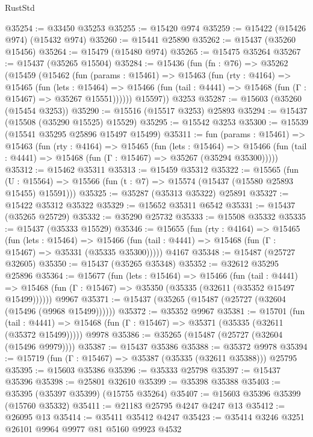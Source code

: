 \begin{lexlean}{RustStd}
\begin{coremodule}
@35254 := @33450 @35253
@35255 := @15420 @974
@35259 := @15422 (@15426 @974) (@15432 @974)
@35260 := @15441 @25890
@35262 := @15437 (@35260 @15456)
@35264 := @15479 (@15480 @974)
@35265 := @15475 @35264
@35267 := @15437 (@35265 @15504)
@35284 := @15436
    (fun (fn : @76) =>
    @35262
      (@15459
        (@15462
          (fun (params : @15461) =>
          @15463
            (fun (rty : @4164) =>
            @15465
              (fun (lets : @15464) =>
              @15466 (fun (tail : @4441) => @15468 (fun (Γ : @15467) => @35267 @15551))))))
        @15597))
    @3253
@35287 := @15603 (@35260 (@15454 @3253))
@35290 := @15516 (@15517 @3253) @25893
@35294 := @15437 (@15508 (@35290 @15525) @15529)
@35295 := @15542 @3253
@35300 := @15539 (@15541 @35295 @25896 @15497 @15499)
@35311 := fun (params : @15461) =>
  @15463
    (fun (rty : @4164) =>
    @15465
      (fun (lets : @15464) =>
      @15466 (fun (tail : @4441) => @15468 (fun (Γ : @15467) => @35267 (@35294 @35300)))))
@35312 := @15462 @35311
@35313 := @15459 @35312
@35322 := @15565
    (fun (U : @15564) => @15566 (fun (t : @7) => @15574 (@15437 (@15580 @25893 @15455) @15591)))
@35325 := @35287 (@35313 @35322) @25891
@35327 := @15422 @35312 @35322
@35329 := @15652 @35311 @6542
@35331 := @15437 (@35265 @25729)
@35332 := @35290 @25732
@35333 := @15508 @35332
@35335 := @15437 (@35333 @15529)
@35346 := @15655
    (fun (rty : @4164) =>
    @15465
      (fun (lets : @15464) =>
      @15466 (fun (tail : @4441) => @15468 (fun (Γ : @15467) => @35331 (@35335 @35300)))))
    @4167
@35348 := @15487 (@25727 @32605)
@35350 := @15437 (@35265 @35348)
@35352 := @32612 @35295 @25896
@35364 := @15677
    (fun (lets : @15464) =>
    @15466
      (fun (tail : @4441) =>
      @15468 (fun (Γ : @15467) => @35350 (@35335 (@32611 (@35352 @15497 @15499))))))
    @9967
@35371 := @15437 (@35265 (@15487 (@25727 (@32604 (@15496 (@9968 @15499))))))
@35372 := @35352 @9967
@35381 := @15701
    (fun (tail : @4441) => @15468 (fun (Γ : @15467) => @35371 (@35335 (@32611 (@35372 @15499)))))
    @9978
@35386 := @35265 (@15487 (@25727 (@32604 (@15496 @9979))))
@35387 := @15437 @35386
@35388 := @35372 @9978
@35394 := @15719 (fun (Γ : @15467) => @35387 (@35335 (@32611 @35388))) @25795
@35395 := @15603 @35386
@35396 := @35333 @25798
@35397 := @15437 @35396
@35398 := @25801 @32610
@35399 := @35398 @35388
@35403 := @35395 (@35397 @35399) (@15755 @35264)
@35407 := @15603 @35396 @35399 (@15760 @35332)
@35411 := @21183 @25795 @4247 @4247 @13
@35412 := @26095 @13
@35414 := @35411 @35412 @4247
@35423 := @35414 @3246 @3251 @26101 @9964 @9977 @81 @5160 @9923 @4532

\end{coremodule}
\end{lexlean}
